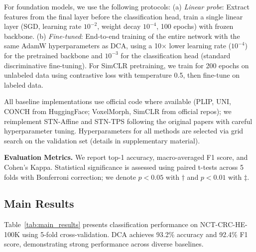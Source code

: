 \documentclass[final,3p,times,review,sort&compress]{elsarticle}
\begin{document}
For foundation models, we use the following protocols: (a) \textit{Linear probe}: Extract features from the final layer before the classification head, train a single linear layer (SGD, learning rate $10^{-2}$, weight decay $10^{-4}$, 100 epochs) with frozen backbone. (b) \textit{Fine-tuned}: End-to-end training of the entire network with the same AdamW hyperparameters as DCA, using a 10× lower learning rate ($10^{-4}$) for the pretrained backbone and $10^{-3}$ for the classification head (standard discriminative fine-tuning). For SimCLR pretraining, we train for 200 epochs on unlabeled data using contrastive loss with temperature 0.5, then fine-tune on labeled data.

All baseline implementations use official code where available (PLIP, UNI, CONCH from HuggingFace; VoxelMorph, SimCLR from official repos); we reimplement STN-Affine and STN-TPS following the original papers with careful hyperparameter tuning. Hyperparameters for all methods are selected via grid search on the validation set (details in supplementary material).

\textbf{Evaluation Metrics.} We report top-1 accuracy, macro-averaged F1 score, and Cohen's Kappa. Statistical significance is assessed using paired t-tests across 5 folds with Bonferroni correction; we denote $p < 0.05$ with $\dagger$ and $p < 0.01$ with $\ddagger$.

\subsection{Main Results}

Table~\ref{tab:main_results} presents classification performance on NCT-CRC-HE-100K using 5-fold cross-validation. DCA achieves 93.2\% accuracy and 92.4\% F1 score, demonstrating strong performance across diverse baselines.
\end{document}

